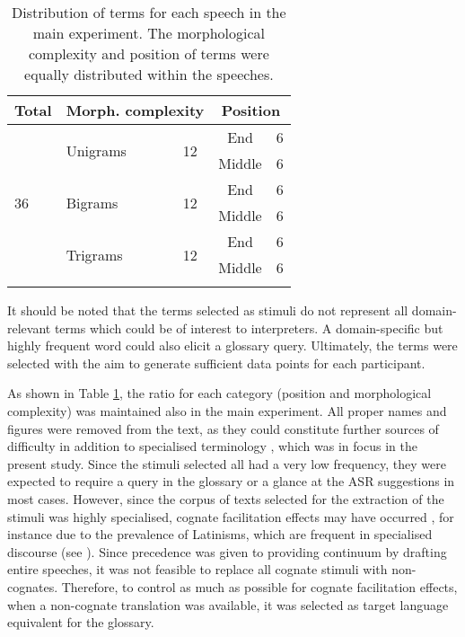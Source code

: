 \begin{table}
\begin{tabular}{llccc}
    \lsptoprule
    {Total} & \multicolumn{2}{c}{Morph. complexity} & \multicolumn{2}{c}{{Position}}\\\midrule
   \multirow{6}{*}[-10pt]{36} & \multirow{2}{*}{Unigrams} & \multirow{2}{*}{12} & End & 6\\\cmidrule{4-5}
   & & & Middle & 6\\   \cmidrule{2-5}
   & \multirow{2}{*}{Bigrams} & \multirow{2}{*}{12} & End & 6\\   \cmidrule{4-5}
   & & & Middle & 6\\  \cmidrule{2-5}
   & \multirow{2}{*}{Trigrams} & \multirow{2}{*}{12} & End & 6\\   \cmidrule{4-5}
   & & & Middle & 6\\
   \lspbottomrule
    \end{tabular}
\caption[Distribution of stimulus terms in the main experiment]{Distribution of terms for each speech in the main experiment. The morphological complexity and position of terms were equally distributed within the speeches.\label{tab:termsdistribution}}
\end{table}

It should be noted that the terms selected as stimuli do not represent all do\-main-rel\-e\-vant terms which could be of interest to interpreters. A domain-specific but highly frequent word could also elicit a glossary query. Ultimately, the terms were selected with the aim to generate sufficient data points for each participant.

As shown in Table \ref{tab:termsdistribution}, the ratio for each category (position and morphological complexity) was maintained also in the main experiment. All proper names and figures were removed from the text, as they could constitute further sources of difficulty in addition to specialised terminology \citep{gile_regards_1995, gile_basic_2009}, which was in focus in the present study. Since the stimuli selected all had a very low frequency, they were expected to require a query in the glossary or a glance at the ASR suggestions in most cases. However, since the corpus of texts selected for the extraction of the stimuli was highly specialised, cognate facilitation effects may have occurred \citep{costa2000cognate}, for instance due to the prevalence of Latinisms, which are frequent in specialised discourse (see ). Since precedence was given to providing continuum by drafting entire speeches, it was not feasible to replace all cognate stimuli with non-cognates. Therefore, to control as much as possible for cognate facilitation effects, when a non-cognate translation was available, it was selected as target language equivalent for the glossary.

